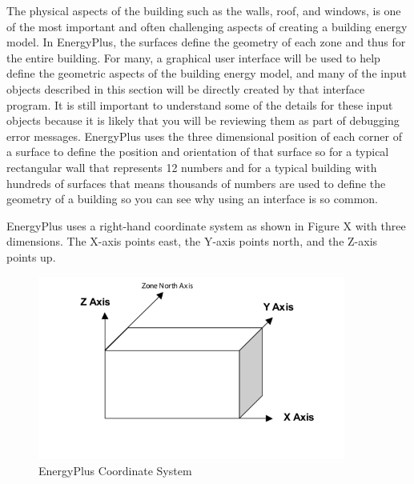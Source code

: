 The physical aspects of the building such as the walls, roof, and
windows, is one of the most important and often challenging aspects
of creating a building energy model. In EnergyPlus, the surfaces define
the geometry of each zone and thus for the entire building. For many,
a graphical user interface will be used to help define the geometric
aspects of the building energy model, and many of the input objects
described in this section will be directly created by that interface
program. It is still important to understand some of the details for
these input objects because it is likely that you will be reviewing
them as part of debugging error messages. EnergyPlus uses the three
dimensional position of each corner of a surface to define the position
and orientation of that surface so for a typical rectangular wall
that represents 12 numbers and for a typical building with hundreds
of surfaces that means thousands of numbers are used to define the
geometry of a building so you can see why using an interface is so
common.

EnergyPlus uses a right-hand coordinate system as shown in Figure
X with three dimensions. The X-axis points east, the Y-axis points
north, and the Z-axis points up.

\begin{figure}[hbtp]
\centering
\includegraphics[width=0.9\textwidth, height=0.9\textheight, keepaspectratio=true]{media/coordinatesystem.png}
\caption{EnergyPlus Coordinate System}
\end{figure}

